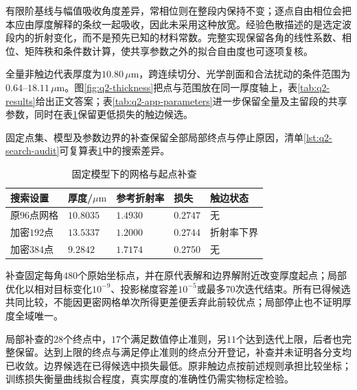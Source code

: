 有限阶基线与幅值吸收角度差异，常相位则在整段内保持不变；逐点自由相位会把本应由厚度解释的条纹一起吸收，因此未采用这种放宽。经验色散描述的是选定波段内的折射变化，而不是预先已知的材料常数。完整实现保留各角的线性系数、相位、矩阵秩和条件数计算，使共享参数之外的拟合自由度也可逐项复核。

全量非触边代表厚度为$10.80\,\mu\mathrm{m}$，跨连续切分、光学剖面和合法扰动的条件范围为$0.64$--$18.11\,\mu\mathrm{m}$。图\ref{fig:q2-thickness}把点与范围放在同一厚度轴上，表\ref{tab:q2-results}给出正文答案；表\ref{tab:q2-app-parameters}进一步保留全量及主留段的共享参数，同时在表\ref{tab:q2-search-check}保留更低损失的触边候选。

固定点集、模型及参数边界的补查保留全部局部终点与停止原因，清单\ref{lst:q2-search-audit}可复算表\ref{tab:q2-search-check}中的搜索差异。

\begingroup
\small
\begin{longtable}{>{\centering\arraybackslash}p{}>{\centering\arraybackslash}p{}>{\centering\arraybackslash}p{}>{\centering\arraybackslash}p{}>{\centering\arraybackslash}p{}}
\caption{固定模型下的网格与起点补查}\label{tab:q2-search-check}\\
\hline
搜索设置 & 厚度/$\mu\mathrm{m}$ & 参考折射率 & 损失 & 触边状态\\
\hline
原$96$点网格 & $10.8035$ & $1.4930$ & $0.2747$ & 无\\
加密$192$点 & $13.5337$ & $1.2000$ & $0.2744$ & 折射率下界\\
加密$384$点 & $9.2842$ & $1.7174$ & $0.2750$ & 无\\
\hline
\end{longtable}
\endgroup

补查固定每角$480$个原始坐标点，并在原代表解和边界解附近改变厚度起点；局部优化以相对目标变化$10^{-9}$、投影梯度容差$10^{-5}$或最多$70$次迭代结束。所有已得候选共同比较，不能因更密网格单次所得更差便丢弃此前较优点；局部停止也不证明厚度全域唯一。

局部补查的$28$个终点中，$17$个满足数值停止准则，另$11$个达到迭代上限，后者也完整保留。达到上限的终点与满足停止准则的终点分开登记，补查并未证明各分支均已收敛。边界候选在已得候选中损失最低。原非触边点按前述规则承担比较坐标；训练损失衡量曲线拟合程度，真实厚度的准确性仍需实物标定检验。
\begingroup
\renewcommand{\lstlistingname}{清单}

\endgroup


